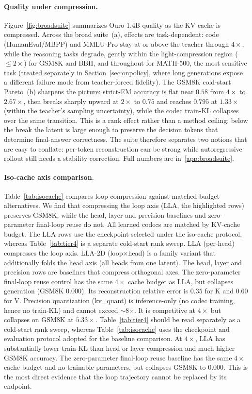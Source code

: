 \documentclass[10pt]{article}
\newcommand{\lla}{LLA}
\begin{document}
\paragraph{Quality under compression.}
\FigureBroadSuite
Figure~\ref{fig:broadsuite} summarizes Ouro-1.4B quality as the KV-cache is compressed. Across the broad suite~(a), effects are task-dependent: code (HumanEval/MBPP) and MMLU-Pro stay at or above the teacher through $4\times$, while the reasoning tasks degrade, gently within the light-compression region ($\le 2\times$) for GSM8K and BBH, and throughout for MATH-500, the most sensitive task (treated separately in Section~\ref{sec:onpolicy}, where long generations expose a different failure mode from teacher-forced fidelity). The GSM8K cold-start Pareto~(b) sharpens the picture: strict-EM accuracy is flat near $0.58$ from $4\times$ to $2.67\times$, then breaks sharply upward at $2\times$ to $0.75$ and reaches $0.795$ at $1.33\times$ (within the teacher's sampling uncertainty), while the codec train-KL collapses over the same transition. This is a rank effect rather than a method ceiling: below the break the latent is large enough to preserve the decision tokens that determine final-answer correctness. The suite therefore separates two notions that are easy to conflate: per-token reconstruction can be strong while autoregressive rollout still needs a stability correction. Full numbers are in~\autoref{app:broadsuite}.


\paragraph{Iso-cache axis comparison.}
\TableIsoCache
\FigureParetoOne
Table~\ref{tab:isocache} compares loop compression against matched-budget alternatives. 
We find that compressing the loop axis (\lla{}, the highlighted rows) preserves GSM8K, while the head, layer and precision baselines and zero-parameter final-loop reuse do not. All learned codecs are matched by KV-cache budget. The LLA rows use the checkpoint selected under the iso-cache protocol, whereas Table~\ref{tab:tier4} is a separate cold-start rank sweep. LLA (per-head) compresses the loop axis. LLA-2D (loop$\times$head) is a family variant that additionally folds the head axis (all heads from one latent). The head, layer and precision rows are baselines that compress orthogonal axes. The zero-parameter final-loop reuse control has the same $4\times$ cache budget as LLA, but collapses generation (GSM8K $0.000$). Its reconstruction relative error is $0.35$ for K and $0.60$ for V. Precision quantization (kv\_quant) is inference-only (no codec training, hence no train-KL) and cannot exceed $\sim$8$\times$. It is competitive at $4\times$ but collapses on GSM8K at $5.33\times$.
Table~\ref{tab:tier4} should be read separately as a cold-start rank sweep, whereas Table~\ref{tab:isocache} uses the checkpoint and evaluation protocol adopted for the baseline comparison. At $4\times$, \lla{} has substantially lower train-KL than head or layer compression and much higher GSM8K accuracy. The zero-parameter final-loop reuse baseline has the same $4\times$ cache budget and no trainable parameters, but collapses GSM8K to 0.000. This is the most direct evidence that the loop trajectory cannot be replaced by its endpoint.
\end{document}
